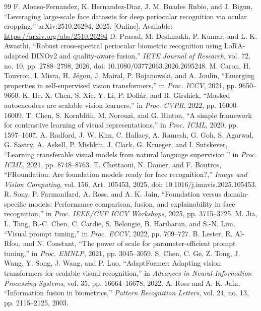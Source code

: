 \documentclass[10pt,lettersize,journal]{IEEEtran}
\begin{document}
\begin{thebibliography}{99}
 F. Alonso-Fernandez, K. Hernandez-Diaz, J. M. Buades Rubio, and J. Bigun, ``Leveraging large-scale face datasets for deep periocular recognition via ocular cropping,'' arXiv:2510.26294, 2025. [Online]. Available: \url{https://arxiv.org/abs/2510.26294}
 D. Prasad, M. Deshmukh, P. Kumar, and L. K. Awasthi, ``Robust cross-spectral periocular biometric recognition using LoRA-adapted DINOv2 and quality-aware fusion,'' \textit{IETE Journal of Research}, vol. 72, no. 10, pp. 2788--2798, 2026, doi: 10.1080/03772063.2026.2695248.
 M. Caron, H. Touvron, I. Misra, H. J\'egou, J. Mairal, P. Bojanowski, and A. Joulin, ``Emerging properties in self-supervised vision transformers,'' in \textit{Proc. ICCV}, 2021, pp. 9650--9660.
 K. He, X. Chen, S. Xie, Y. Li, P. Doll\'ar, and R. Girshick, ``Masked autoencoders are scalable vision learners,'' in \textit{Proc. CVPR}, 2022, pp. 16000--16009.
 T. Chen, S. Kornblith, M. Norouzi, and G. Hinton, ``A simple framework for contrastive learning of visual representations,'' in \textit{Proc. ICML}, 2020, pp. 1597--1607.
 A. Radford, J. W. Kim, C. Hallacy, A. Ramesh, G. Goh, S. Agarwal, G. Sastry, A. Askell, P. Mishkin, J. Clark, G. Krueger, and I. Sutskever, ``Learning transferable visual models from natural language supervision,'' in \textit{Proc. ICML}, 2021, pp. 8748--8763.
 T. Chettaoui, N. Damer, and F. Boutros, ``FRoundation: Are foundation models ready for face recognition?,'' \textit{Image and Vision Computing}, vol. 156, Art. 105453, 2025, doi: 10.1016/j.imavis.2025.105453.
 R. Sony, P. Farmanifard, A. Ross, and A. K. Jain, ``Foundation versus domain-specific models: Performance comparison, fusion, and explainability in face recognition,'' in \textit{Proc. IEEE/CVF ICCV Workshops}, 2025, pp. 3715--3725.
 M. Jia, L. Tang, B.-C. Chen, C. Cardie, S. Belongie, B. Hariharan, and S.-N. Lim, ``Visual prompt tuning,'' in \textit{Proc. ECCV}, 2022, pp. 709--727.
 B. Lester, R. Al-Rfou, and N. Constant, ``The power of scale for parameter-efficient prompt tuning,'' in \textit{Proc. EMNLP}, 2021, pp. 3045--3059.
 S. Chen, C. Ge, Z. Tong, J. Wang, Y. Song, J. Wang, and P. Luo, ``AdaptFormer: Adapting vision transformers for scalable visual recognition,'' in \textit{Advances in Neural Information Processing Systems}, vol. 35, pp. 16664--16678, 2022.
 A. Ross and A. K. Jain, ``Information fusion in biometrics,'' \textit{Pattern Recognition Letters}, vol. 24, no. 13, pp. 2115--2125, 2003.

\end{thebibliography}
\end{document}
